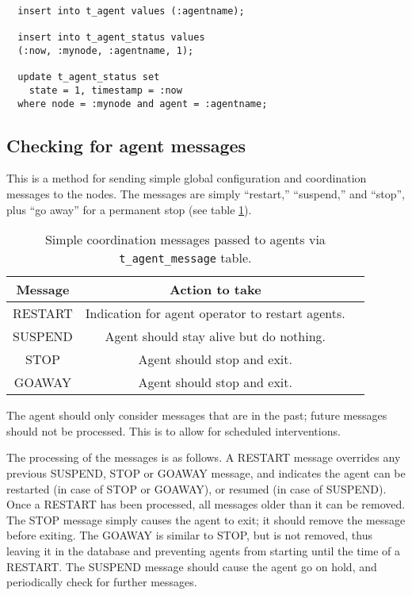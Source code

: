 \documentclass{cmspaper}
\begin{document}
{\small\begin{verbatim}
  insert into t_agent values (:agentname);

  insert into t_agent_status values
  (:now, :mynode, :agentname, 1);

  update t_agent_status set
    state = 1, timestamp = :now
  where node = :mynode and agent = :agentname;
\end{verbatim}}

\subsection{Checking for agent messages}

This is a  method for sending simple global configuration and coordination messages to the nodes.  The messages are simply ``restart,'' ``suspend,'' and ``stop'', plus ``go away'' for a permanent stop (see table \ref{table:messages}).

\begin{table}
\centering
\begin{tabular}[!h]{|c|c|l|} 
\hline Message  & Action to take
\\ \hline
	RESTART & Indication for agent operator to restart agents.
\\	SUSPEND & Agent should stay alive but do nothing.
\\	STOP    & Agent should stop and exit.
\\	GOAWAY  & Agent should stop and exit.
\\ \hline
\end{tabular}
\caption{Simple coordination messages passed to agents via \texttt{t\_agent\_message} table.}
\label{table:messages}
\end{table}

The agent should only consider messages that are in the past; future messages should not be processed.  This is to allow for scheduled interventions.

The processing of the messages is as follows.  A RESTART message overrides any previous SUSPEND, STOP or GOAWAY message, and indicates the agent can be restarted (in case of STOP or GOAWAY), or resumed (in case of SUSPEND).  Once a RESTART has been processed, all messages older than it can be removed.  The STOP message simply causes the agent to exit; it should remove the message before exiting.  The GOAWAY is similar to STOP, but is not removed, thus leaving it in the database and preventing agents from starting until the time of a RESTART.  The SUSPEND message should cause the agent go on hold, and periodically check for further messages.
\end{document}
